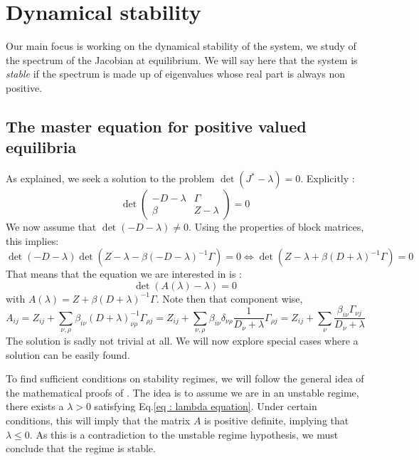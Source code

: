 \documentclass[12pt, titlepage]{report}
\begin{document}
	\clearpage
	\section{Dynamical stability}
	Our main focus is working on the dynamical stability of the system, \ie we study of the spectrum of the Jacobian at equilibrium. We will say here that the system is \textit{stable} if the spectrum is made up of eigenvalues whose real part is always non positive.
		\subsection{The master equation for positive valued equilibria}
	As explained, we seek a solution to the problem $\det\left(J^* - \lambda \right) = 0$. Explicitly :
	\begin{equation}
		\det
		\begin{pmatrix}
			-D - \lambda  & \Gamma \\
			\beta & Z-\lambda
		\end{pmatrix} = 0
	\end{equation}
	We now assume that $\det\left(-D-\lambda\right)\neq 0$. Using the properties of block matrices, this implies:
	\begin{equation}
		\det\left(-D-\lambda\right)\det\left(Z-\lambda-\beta\left(-D-\lambda\right)^{-1}\Gamma\right) = 0 \iff \det\left(Z-\lambda+\beta\left(D+\lambda\right)^{-1}\Gamma\right) =0
	\end{equation}
	That means that the equation we are interested in is :
	\begin{equation}
		\boxed{\det\left(A(\lambda)-\lambda\right) =0} \label{eq : lambda equation}
	\end{equation}
	with $A(\lambda) = Z + \beta\left(D+\lambda\right)^{-1}\Gamma$.
	Note then that component wise,
	\begin{equation}
	A_{ij} = Z_{ij}+\sum_{\nu,\rho} \beta_{i\nu}\left(D+\lambda\right)^{-1}_{\nu\rho}\Gamma_{\rho j} = Z_{ij}+\sum_{\nu, \rho} \beta_{i\nu} \delta_{\nu \rho} \frac{1}{D_\nu + \lambda} \Gamma_{\rho j} = Z_{ij}+\sum_{\nu} \frac{\beta_{i\nu}\Gamma_{\nu j}}{D_\nu + \lambda} \label{eq : Aij definition}
	\end{equation}
	The solution is sadly not trivial at all. We will now explore special cases where a solution can be easily found.

	To find sufficient conditions on stability regimes, we will follow the general idea of the mathematical proofs of \cite{Butler:2018aa}. The idea is to assume we are in an unstable regime, there exists a \ie $\lambda > 0$ satisfying Eq.\eqref{eq : lambda equation}. Under certain conditions, this will imply that the matrix $A$ is positive definite, implying that $\lambda \leq 0$. As this is a contradiction to the unstable regime hypothesis, we must conclude that the regime is stable.
\end{document}
